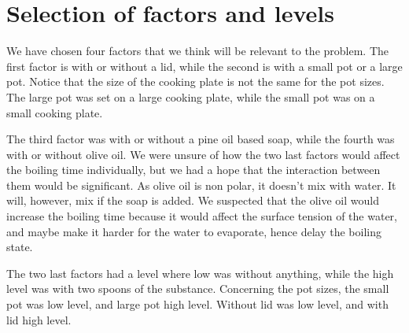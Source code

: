 \section*{Selection of factors and levels}
We have chosen four factors that we think will be relevant to the problem. The first factor is with or without a lid, while the second is with a small pot or a large pot. Notice that the size of the cooking plate is not the same for the pot sizes. The large pot was set on a large cooking plate, while the small pot was on a small cooking plate.

The third factor was with or without a pine oil based soap, while the fourth was with or without olive oil. We were unsure of how the two last factors would affect the boiling time individually, but we had a hope that the interaction between them would be significant. As olive oil is non polar, it doesn't mix with water. It will, however, mix if the soap is added. We suspected that the olive oil would increase the boiling time because it would affect the surface tension of the water, and maybe make it harder for the water to evaporate, hence delay the boiling state.

The two last factors had a level where low was without anything, while the high level was with two spoons of the substance. Concerning the pot sizes, the small pot was low level, and large pot high level. Without lid was low level, and with lid high level.